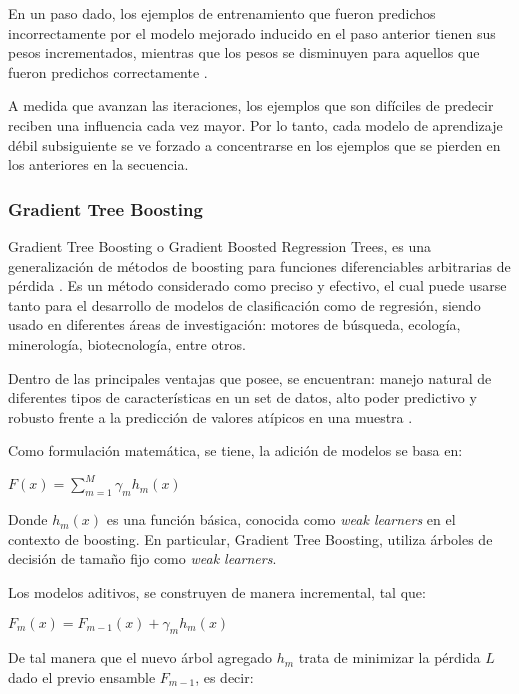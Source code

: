 En un paso dado, los ejemplos de entrenamiento que fueron predichos incorrectamente por el modelo mejorado inducido en el paso anterior tienen sus pesos incrementados, mientras que los pesos se disminuyen para aquellos que fueron predichos correctamente \cite{hastie2009multi}. 

A medida que avanzan las iteraciones, los ejemplos que son difíciles de predecir reciben una influencia cada vez mayor. Por lo tanto, cada modelo de aprendizaje débil subsiguiente se ve forzado a concentrarse en los ejemplos que se pierden en los anteriores en la secuencia.

\subsubsection{Gradient Tree Boosting}

Gradient Tree Boosting o Gradient Boosted Regression Trees, es una generalización de métodos de boosting para funciones diferenciables arbitrarias de pérdida \cite{gradient}. Es un método considerado como preciso y efectivo, el cual puede usarse tanto para el desarrollo de modelos de clasificación como de regresión, siendo usado en diferentes áreas de investigación: motores de búsqueda, ecología, minerología, biotecnología, entre otros.

Dentro de las principales ventajas que posee, se encuentran: manejo natural de diferentes tipos de características en un set de datos, alto poder predictivo y robusto frente a la predicción de valores atípicos en una muestra \cite{FRIEDMAN2002367}.

Como formulación matemática, se tiene, la adición de modelos se basa en:

\begin{center}
	$F(x) = \sum_{m=1}^{M} \gamma_m h_m(x)$
\end{center}

Donde $h_{m}(x)$ es una función básica, conocida como \textit{weak learners} en el contexto de boosting. En particular, Gradient Tree Boosting, utiliza árboles de decisión de tamaño fijo como \textit{weak learners}. 


Los modelos aditivos, se construyen de manera incremental, tal que:

\begin{center}
	$F_m(x) = F_{m-1}(x) + \gamma_m h_m(x)$
\end{center}

De tal manera que el nuevo árbol agregado $h_{m}$ trata de minimizar la pérdida $L$ dado el previo ensamble $F_{m-1}$, es decir:

